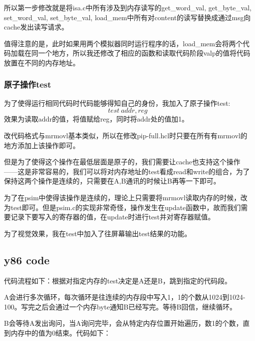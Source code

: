 \documentclass{article}
\theoremstyle{plain} \newtheorem{theorem}{常识}[section]
\theoremstyle{plain} \newtheorem{lizi}{例}[section]
\begin{document}
所以第一步修改就是将isa.c中所有涉及到内存读写的get\_word\_val, get\_byte\_val, set\_word\_val, set\_byte\_val, load\_mem中所有对content的读写替换成通过msg向cache发出读写请求。

值得注意的是，此时如果用两个模拟器同时运行程序的话，load\_mem会将两个代码加载在同一个地方，所以我还修改了相应的函数和读取代码阶段valp的值将代码放置在不同的内存地址。

\subsubsection{原子操作test}
为了使得运行相同代码时代码能够得知自己的身份，我加入了原子操作test:
$$test\ addr,reg$$
效果为读取addr的值，将值赋给reg，同时将addr处的值加1。

改代码格式与mrmovl基本类似，所以在修改pip-full.hcl时只要在所有有mrmovl的地方添加上该操作即可。

但是为了使得这个操作在最低层面是原子的，我们需要让cache也支持这个操作——这是非常容易的，我们可以将对内存地址的test看成read和write的组合，为了保持这两个操作是连续的，只需要在A,B通讯的时候让B再等一下即可。

为了在psim中使得该操作是连续的，理论上只需要将mrmovl读取内存的时候，改为test即可。但是psim.c的实现非常奇怪，操作发生在update函数中，故而我们需要记录下要写入的寄存器的值，在update时进行test并对寄存器赋值。

为了视觉效果，我在test中加入了往屏幕输出test结果的功能。

\subsection{y86 code}

代码流程如下：根据对指定内存的test决定是A还是B，跳到指定的代码段。

A会进行多次循环，每次循环是往连续的内存段中写入1，1的个数从1024到1024-100。写完之后会通过一个内存byte通知B已经写完。等待B回信，继续循环。

B会等待A发出询问，当A询问完毕，会从特定内存位置开始遍历，数1的个数，直到内存中的值为0结束。代码如下：
\end{document}

